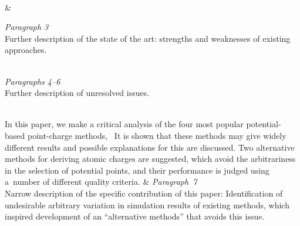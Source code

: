 \documentclass[12pt, a4paper, oneside]{article}
\newlength{\smalllinespacing}
\theoremstyle{Plain}
\theoremstyle{Definition}
\theoremstyle{Remark}
\begin{document}
\begin{tcolorbox}
\begin{tblr}{}
{			\\
			\null\hspace{\smalllinespacing}\textellipsis
		}
		&
		{%
			\textit{Paragraph 3} \\
			Further description of the state of the art: strengths and weaknesses of existing approaches. \\
			\strut \\[2ex]
			\textit{Paragraphs 4--6} \\
			Further description of unresolved issues.
		}
		\\
		\hspace{\smalllinespacing}In this paper, we make a critical analysis of the four most popular potential-based point-charge methods, \textellipsis\ It is shown that these methods may give widely different results and possible explanations for this are discussed. Two alternative methods for deriving atomic charges are suggested, which avoid the arbitrariness in the selection of potential points, and their performance is judged using a~number of different quality criteria.
		&
		{%
			\textit{Paragraph~7} \\
			Narrow description of the specific contribution of this paper: Identification of undesirable arbitrary variation in simulation results of existing methods, which inspired development of an ``alternative methods'' that avoids this issue.
		}
	\end{tblr}
\end{tcolorbox}
\end{document}
